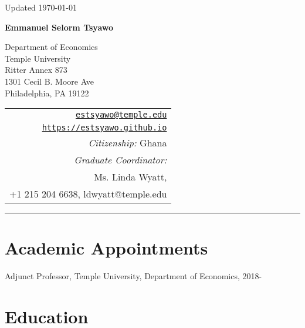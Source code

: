 \documentclass[letterpaper]{article}
\def\name{Emmanuel Selorm Tsyawo}
\renewenvironment{itemize}{
  \begin{list}{}{
    \setlength{\leftmargin}{1.5em}
  }
}{
  \end{list}
}
\begin{document}
\begin{minipage}{\linewidth}
  \begin{flushright}
    Updated \today
  \end{flushright}
\end{minipage}

\vspace{10pt}


\centerline{\huge \bf \name}

\vspace{0.25in}

\begin{minipage}{0.65\linewidth}
  Department of Economics \\
  Temple University \\
  Ritter Annex 873 \\
  1301 Cecil B. Moore Ave \\
  Philadelphia, PA 19122
\end{minipage}
\begin{minipage}{0.5\linewidth}
  \begin{tabular}{r}
    \href{mailto:estsyawo@temple.edu.edu}{\tt estsyawo@temple.edu} \\
    \href{https://estsyawo.github.io}{\tt https://estsyawo.github.io} \\
    \emph{Citizenship:} Ghana\\
    \emph{Graduate Coordinator:} \\
    Ms. Linda Wyatt, \\
    +1 215 204 6638, {\color{blue} ldwyatt@temple.edu}
    
  \end{tabular}
\end{minipage}

\vspace{10pt}
\rule{\linewidth}{0.4pt}


\section*{Academic Appointments}
\begin{itemize}
  \item Adjunct Professor, Temple University, Department of Economics, 2018-
\end{itemize}

\section*{Education}
\end{document}
